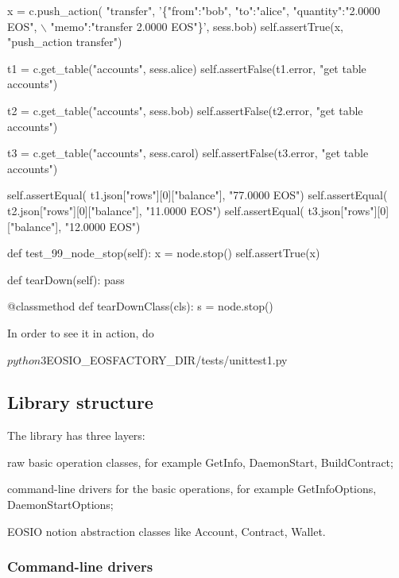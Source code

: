\begin{DoxyCode}
        x = c.push\_action(
            "transfer", 
            '\{"from":"bob", "to":"alice", "quantity":"2.0000 EOS", \(\backslash\)
                "memo":"transfer 2.0000 EOS"\}', 
            sess.bob)
        self.assertTrue(x, "push\_action transfer")

        t1 =  c.get\_table("accounts", sess.alice)
        self.assertFalse(t1.error, "get table accounts")

        t2 = c.get\_table("accounts", sess.bob)
        self.assertFalse(t2.error, "get table accounts")

        t3 = c.get\_table("accounts", sess.carol)
        self.assertFalse(t3.error, "get table accounts")

        self.assertEqual(
            t1.json["rows"][0]["balance"], "77.0000 EOS")
        self.assertEqual(
            t2.json["rows"][0]["balance"], "11.0000 EOS")
        self.assertEqual(
            t3.json["rows"][0]["balance"], "12.0000 EOS")


    def test\_99\_node\_stop(self):
        x = node.stop()
        self.assertTrue(x)


    def tearDown(self):
        pass

    @classmethod
    def tearDownClass(cls):
        s = node.stop()
\end{DoxyCode}
 In order to see it in action, do 
\begin{DoxyCode}
$ python3 $EOSIO\_EOSFACTORY\_DIR/tests/unittest1.py
\end{DoxyCode}


\subsection*{Library structure}

The library has three layers\+:
\begin{DoxyItemize}
\item raw basic operation classes, for example Get\+Info, Daemon\+Start, Build\+Contract;
\item command-\/line drivers for the basic operations, for example Get\+Info\+Options, Daemon\+Start\+Options;
\item E\+O\+S\+IO notion abstraction classes like Account, Contract, Wallet.
\end{DoxyItemize}

\subsubsection*{Command-\/line drivers}

